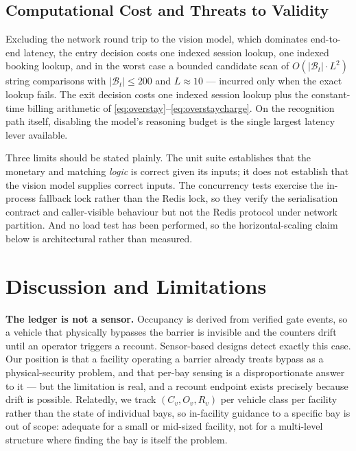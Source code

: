 \documentclass[journal,onecolumn,11pt]{IEEEtran}
\begin{document}
\subsection{Computational Cost and Threats to Validity}

Excluding the network round trip to the vision model, which dominates
end-to-end latency, the entry decision costs one indexed session lookup, one
indexed booking lookup, and in the worst case a bounded candidate scan of
$O(|\mathcal{B}_t| \cdot L^2)$ string comparisons with
$|\mathcal{B}_t| \leq 200$ and $L \approx 10$ --- incurred only when the exact
lookup fails. The exit decision costs one indexed session lookup plus the
constant-time billing arithmetic of
\eqref{eq:overstay}--\eqref{eq:overstaycharge}. On the recognition path itself,
disabling the model's reasoning budget is the single largest latency lever
available.

Three limits should be stated plainly. The unit suite establishes that the
monetary and matching \emph{logic} is correct given its inputs; it does not
establish that the vision model supplies correct inputs. The concurrency tests
exercise the in-process fallback lock rather than the Redis lock, so they
verify the serialisation contract and caller-visible behaviour but not the
Redis protocol under network partition. And no load test has been performed, so
the horizontal-scaling claim below is architectural rather than measured.

\section{Discussion and Limitations}
\label{sec:limitations}

\textbf{The ledger is not a sensor.} Occupancy is derived from verified gate
events, so a vehicle that physically bypasses the barrier is invisible and the
counters drift until an operator triggers a recount. Sensor-based designs
detect exactly this case. Our position is that a facility operating a barrier
already treats bypass as a physical-security problem, and that per-bay sensing
is a disproportionate answer to it --- but the limitation is real, and a
recount endpoint exists precisely because drift is possible. Relatedly, we
track $(C_v, O_v, R_v)$ per vehicle class per facility rather than the state of
individual bays, so in-facility guidance to a specific bay is out of scope:
adequate for a small or mid-sized facility, not for a multi-level structure
where finding the bay is itself the problem.
\end{document}

